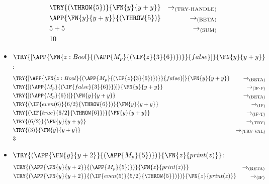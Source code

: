 \begin{itemize}
\begin{align*}
		       & \TRY{(\THROW{5})}{\FN{y}{y+y}}
		       & \to_{\text{(TRY-HANDLE)}}                                \\
		       & \APP{\FN{y}{y+y}}{(\THROW{5})}
		       & \to_{\text{(BETA)}}                                      \\
		       & 5+5
		       & \to_{\text{(SUM)}}                                       \\
		       & 10
	      \end{align*}
	\item $\TRY{[\APP{\FN{z:Bool}{(\APP{M_p}{(\IF{z}{3}{6})})}}{false}]}{\FN{y}{y+y}}$:
	      \begin{align*}
		       & \TRY{[\APP{\FN{z:Bool}{(\APP{M_p}{(\IF{z}{3}{6})})}}{false}]}{\FN{y}{y+y}}
		       & \to_{\text{(BETA)}}                                                        \\
		       & \TRY{[(\APP{M_p}{(\IF{false}{3}{6})})]}{\FN{y}{y+y}}
		       & \to_{\text{(IF-F)}}                                                        \\
		       & \TRY{[(\APP{M_p}{6})]}{\FN{y}{y+y}}
		       & \to_{\text{(BETA)}}                                                        \\
		       & \TRY{(\IF{even(6)}{6/2}{\THROW{6}})}{\FN{y}{y+y}}
		       & \to_{\text{(IF)}}                                                          \\
		       & \TRY{(\IF{true}{6/2}{\THROW{6}})}{\FN{y}{y+y}}
		       & \to_{\text{(IF-T)}}                                                        \\
		       & \TRY{(6/2)}{\FN{y}{y+y}}
		       & \to_{\text{(TRY)}}                                                         \\
		       & \TRY{(3)}{\FN{y}{y+y}}
		       & \to_{\text{(TRY-VAL)}}                                                     \\
		       & 3
	      \end{align*}
	\item $\TRY{(\APP{\FN{y}{y+2}}{(\APP{M_p}{5})})}{\FN{z}{print(z)}}$:
	      \begin{align*}
		       & \TRY{(\APP{\FN{y}{y+2}}{(\APP{M_p}{5})})}{\FN{z}{print(z)}}
		       & \to_{\text{(BETA)}}                                                         \\
		       & \TRY{(\APP{\FN{y}{y+2}}{(\IF{even(5)}{5/2}{\THROW{5}})})}{\FN{z}{print(z)}}
		       & \to_{\text{(IF)}}                                                           \\

\end{align*}
\end{itemize}
